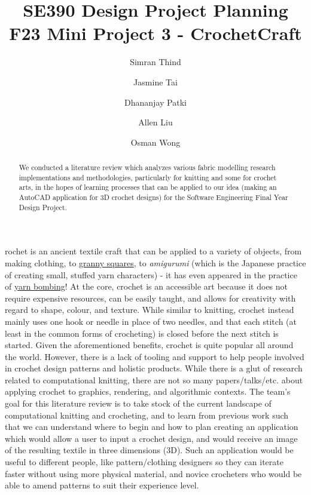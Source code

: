 \documentclass{IEEEcsmag}
\begin{document}

\title{SE390 Design Project Planning F23 Mini Project 3 - CrochetCraft}

\author{Simran Thind}

\author{Jasmine Tai}

\author{Dhananjay Patki}

\author{Allen Liu}

\author{Osman Wong}


\begin{abstract}
    We conducted a literature review which analyzes various fabric modelling research implementations and methodologies, particularly for knitting and some for crochet arts, in the hopes of learning processes that can be applied to our idea (making an AutoCAD application for 3D crochet designs) for the Software Engineering Final Year Design Project.
\end{abstract}

\maketitle

rochet is an ancient textile craft that can be applied to a variety of objects, from making clothing, to \href{https://en.wikipedia.org/wiki/Granny_square}{granny squares}, to \textit{amigurumi} (which is the Japanese practice of creating small, stuffed yarn characters) - it has even appeared in the practice of \href{https://en.wikipedia.org/wiki/Yarn_bombing}{yarn bombing}! At the core, crochet is an accessible art because it does not require expensive resources, can be easily taught, and allows for creativity with regard to shape, colour, and texture. While similar to knitting, crochet instead mainly uses one hook or needle in place of two needles, and that each stitch (at least in the common forms of crocheting) is closed before the next stitch is started. Given the aforementioned benefits, crochet is quite popular all around the world. However, there is a lack of tooling and support to help people involved in crochet design patterns and holistic products. While there is a glut of research related to computational knitting, there are not so many papers/talks/etc. about applying crochet to graphics, rendering, and algorithmic contexts. The team's goal for this literature review is to take stock of the current landscape of computational knitting and crocheting, and to learn from previous work such that we can understand where to begin and how to plan creating an application which would allow a user to input a crochet design, and would receive an image of the resulting textile in three dimensions (3D). Such an application would be useful to different people, like pattern/clothing designers so they can iterate faster without using more physical material, and novice crocheters who would be able to amend patterns to suit their experience level.
\end{document}
